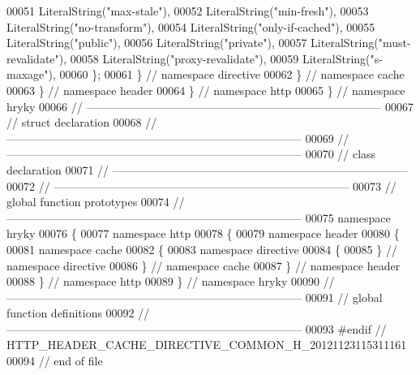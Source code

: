 \begin{DoxyCode}
00051         LiteralString(\textcolor{stringliteral}{"max-stale"}),
00052         LiteralString(\textcolor{stringliteral}{"min-fresh"}),
00053         LiteralString(\textcolor{stringliteral}{"no-transform"}),
00054         LiteralString(\textcolor{stringliteral}{"only-if-cached"}),
00055         LiteralString(\textcolor{stringliteral}{"public"}),
00056         LiteralString(\textcolor{stringliteral}{"private"}),
00057         LiteralString(\textcolor{stringliteral}{"must-revalidate"}),
00058         LiteralString(\textcolor{stringliteral}{"proxy-revalidate"}),
00059         LiteralString(\textcolor{stringliteral}{"s-maxage"}),
00060     \};
00061 \} \textcolor{comment}{// namespace directive}
00062 \} \textcolor{comment}{// namespace cache}
00063 \} \textcolor{comment}{// namespace header}
00064 \} \textcolor{comment}{// namespace http}
00065 \} \textcolor{comment}{// namespace hryky}
00066 \textcolor{comment}{//
      ------------------------------------------------------------------------------}
00067 \textcolor{comment}{// struct declaration}
00068 \textcolor{comment}{//
      ------------------------------------------------------------------------------}
00069 \textcolor{comment}{//
      ------------------------------------------------------------------------------}
00070 \textcolor{comment}{// class declaration}
00071 \textcolor{comment}{//
      ------------------------------------------------------------------------------}
00072 \textcolor{comment}{//
      ------------------------------------------------------------------------------}
00073 \textcolor{comment}{// global function prototypes}
00074 \textcolor{comment}{//
      ------------------------------------------------------------------------------}
00075 \textcolor{keyword}{namespace }hryky
00076 \{
00077 \textcolor{keyword}{namespace }http
00078 \{
00079 \textcolor{keyword}{namespace }header
00080 \{
00081 \textcolor{keyword}{namespace }cache
00082 \{
00083 \textcolor{keyword}{namespace }directive
00084 \{
00085 \} \textcolor{comment}{// namespace directive}
00086 \} \textcolor{comment}{// namespace cache}
00087 \} \textcolor{comment}{// namespace header}
00088 \} \textcolor{comment}{// namespace http}
00089 \} \textcolor{comment}{// namespace hryky}
00090 \textcolor{comment}{//
      ------------------------------------------------------------------------------}
00091 \textcolor{comment}{// global function definitions}
00092 \textcolor{comment}{//
      ------------------------------------------------------------------------------}
00093 \textcolor{preprocessor}{#endif // HTTP\_HEADER\_CACHE\_DIRECTIVE\_COMMON\_H\_20121123115311161}
00094 \textcolor{preprocessor}{}\textcolor{comment}{// end of file}
\end{DoxyCode}
